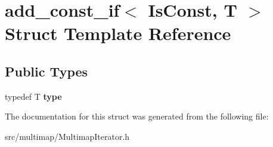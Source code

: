 \hypertarget{structadd__const__if}{}\section{add\+\_\+const\+\_\+if$<$ Is\+Const, T $>$ Struct Template Reference}
\label{structadd__const__if}
\subsection*{Public Types}
\begin{DoxyCompactItemize}
\item 
\mbox{\label{structadd__const__if_a3e6643d31fba37bdb1d3ebeacb121723}} 
typedef T {\bfseries type}
\end{DoxyCompactItemize}


The documentation for this struct was generated from the following file\+:\begin{DoxyCompactItemize}
\item 
src/multimap/Multimap\+Iterator.\+h\end{DoxyCompactItemize}
